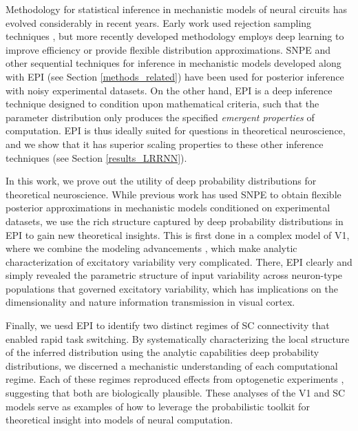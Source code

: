 \documentclass[11pt]{article}
\begin{document}
Methodology for statistical inference in mechanistic models of neural circuits has evolved considerably in recent years.
Early work used rejection sampling techniques \cite{beaumont2002approximate, marjoram2003markov,sisson2007sequential}, but more recently developed methodology employs deep learning to improve efficiency or provide flexible distribution approximations.
SNPE \cite{gonccalves2019training} and other sequential techniques for inference in mechanistic models developed along with EPI (see Section \ref{methods_related}) have been used for posterior inference with noisy experimental datasets.
On the other hand, EPI is a deep inference technique designed to condition upon mathematical criteria, such that the parameter distribution only produces  the specified \textit{emergent properties} of computation.
EPI is thus ideally suited for questions in theoretical neuroscience, and we show that it has superior scaling properties to these other inference techniques (see Section \ref{results_LRRNN}).

In this work, we prove out the utility of deep probability distributions for theoretical neuroscience.
While previous work has used SNPE to obtain flexible posterior approximations in mechanistic models conditioned on experimental datasets, we use the rich structure captured by deep probability distributions in EPI to gain new theoretical insights.
This is first done in a complex model of V1, where we combine the modeling advancements \cite{litwin2016inhibitory, hennequin2018dynamical}, which make analytic characterization of excitatory variability very complicated.
There, EPI clearly and simply revealed the parametric structure of input variability across neuron-type populations that governed excitatory variability, which has implications on the dimensionality and nature information transmission in visual cortex.

Finally, we uesd EPI to identify two distinct regimes of SC connectivity that enabled rapid task switching.
By systematically characterizing the local structure of the inferred distribution using the analytic capabilities deep probability distributions, we discerned a mechanistic understanding of each computational regime.
Each of these regimes reproduced effects from optogenetic experiments \cite{duan2015requirement}, suggesting that both are biologically plausible.
These analyses of the V1 and SC models serve as examples of how to leverage the probabilistic toolkit for theoretical insight into models of neural computation.
\end{document}
